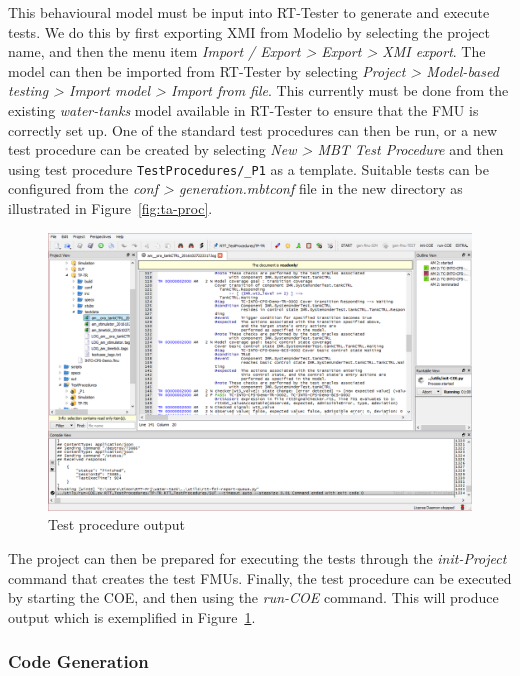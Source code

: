 This behavioural model must be input into RT-Tester to generate and execute tests. We do this by first exporting XMI from Modelio by
selecting the project name, and then the menu item \emph{Import / Export > Export > XMI export}. The model can then be
imported from RT-Tester by selecting \emph{Project > Model-based testing > Import model > Import from file}. This
currently must be done from the existing \emph{water-tanks} model available in RT-Tester to ensure that the FMU is
correctly set up. One of the standard test procedures can then be run, or a new test procedure can be created by
selecting \emph{New > MBT Test Procedure} and then using test procedure \texttt{TestProcedures/\_P1} as a
template. Suitable tests can be configured from the \emph{conf > generation.mbtconf} file in the new directory as
illustrated in Figure~\ref{fig:ta-proc}.

\begin{figure}
  \begin{center}
    \includegraphics[width=16cm]{threetank/ta_rtt1.png}
  \end{center}
  \caption{Test procedure output}
  \label{fig:ta-out}
\end{figure}


The project can then be prepared for executing the tests through the \emph{init-Project} command that creates the test
FMUs. Finally, the test procedure can be executed by starting the COE, and then using the \emph{run-COE} command. This
will produce output which is exemplified in Figure~\ref{fig:ta-out}.

\subsubsection{Code Generation}

